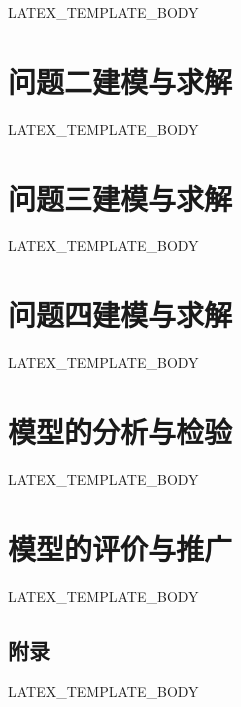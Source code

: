 \documentclass[withoutpreface,bwprint]{cumcmthesis}
\begin{document}
LATEX_TEMPLATE_BODY

\section{问题二建模与求解}

LATEX_TEMPLATE_BODY

\section{问题三建模与求解}

LATEX_TEMPLATE_BODY

\section{问题四建模与求解}
LATEX_TEMPLATE_BODY

\section{模型的分析与检验}

LATEX_TEMPLATE_BODY

\section{模型的评价与推广}

LATEX_TEMPLATE_BODY






\begin{appendices}

  \section{附录}

  LATEX_TEMPLATE_BODY

\end{appendices}
\end{document}
